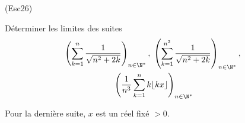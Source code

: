 \begin{tiny}(Esc26)\end{tiny} Déterminer les limites des suites 
\begin{multline*}
 \left( \sum_{k=1}^{n}\frac{1}{\sqrt{n^2+2k}}\right) _{n\in \N^*},\;
 \left( \sum_{k=1}^{n^2}\frac{1}{\sqrt{n^2+2k}}\right) _{n\in \N^*},\; \\
 \left( \frac{1}{n^3}\sum_{k=1}^{n}k\lfloor kx \rfloor\right) _{n\in \N^*}
\end{multline*}

Pour la dernière suite, $x$ est un réel fixé $>0$. 

